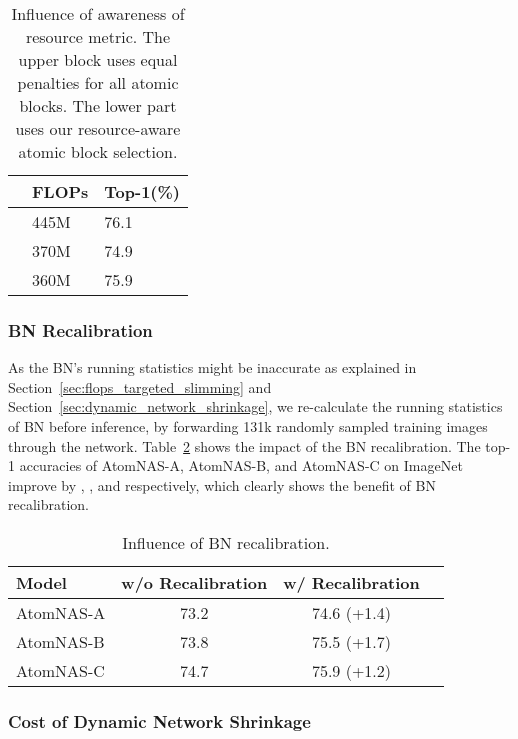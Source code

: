 \documentclass{article} \usepackage{iclr2020_conference,times}
\newcommand{\flops}{FLOPs\xspace}
\begin{document}
\begin{table}[htb]
\caption{Influence of awareness of resource metric. The upper block uses equal penalties for all atomic blocks. The lower part uses our resource-aware atomic block selection.}
\begin{center}
\begin{tabular}{lll}
\toprule
 & \flops & Top-1(\%) \\
\midrule
 & 445M & 76.1 \\
 & 370M & 74.9 \\
\midrule
 & 360M & 75.9 \\
\bottomrule
\end{tabular}
\end{center}
\label{tab:equal_baseline}
\end{table}

\subsubsection{BN Recalibration}

As the BN's running statistics might be inaccurate as explained in Section~\ref{sec:flops_targeted_slimming} and Section~\ref{sec:dynamic_network_shrinkage}, we re-calculate the running statistics of BN before inference, by forwarding 131k randomly sampled training images through the network. Table~\ref{tab:bn_calib} shows the impact of the BN recalibration. The top-1 accuracies of AtomNAS-A, AtomNAS-B, and AtomNAS-C on ImageNet improve by , , and  respectively, which clearly shows the benefit of BN recalibration. 




\begin{table}[htb]
\caption{Influence of BN recalibration.}
\begin{center}
\begin{tabular}{lccc}
\toprule
Model   & w/o Recalibration & w/ Recalibration\\
\midrule
AtomNAS-A  & 73.2 & 74.6 (+1.4) \\
AtomNAS-B  & 73.8 & 75.5 (+1.7) \\
AtomNAS-C  & 74.7 & 75.9 (+1.2) \\
\bottomrule
\end{tabular}
\end{center}
\label{tab:bn_calib}
\end{table}

\subsubsection{Cost of Dynamic Network Shrinkage}
\label{ssub:search_cost}
\end{document}
